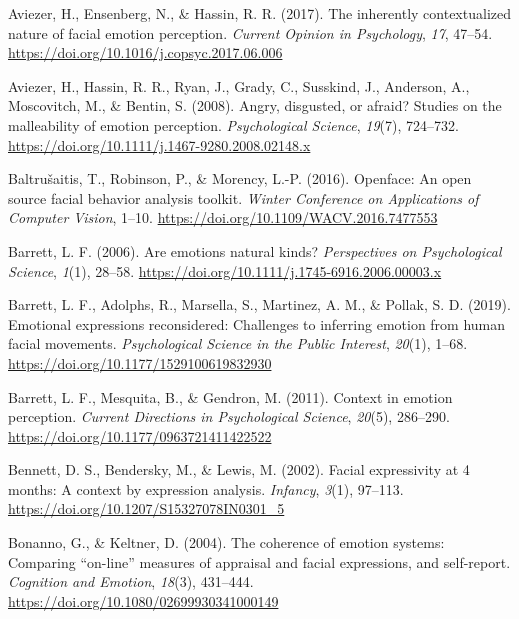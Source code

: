 \documentclass[
  english,
  doc]{apa7}
\newlength{\cslhangindent}
\newenvironment{cslreferences}%
  {\setlength{\parindent}{0pt}%
  \everypar{\setlength{\hangindent}{\cslhangindent}}\ignorespaces}%
  {\par}
\begin{document}
\begingroup
\setlength{\parindent}{-0.5in}
\setlength{\leftskip}{0.5in}

\hypertarget{refs}{}
\begin{cslreferences}
\leavevmode\hypertarget{ref-aviezer2017inherently}{}%
Aviezer, H., Ensenberg, N., \& Hassin, R. R. (2017). The inherently contextualized nature of facial emotion perception. \emph{Current Opinion in Psychology}, \emph{17}, 47--54. \url{https://doi.org/10.1016/j.copsyc.2017.06.006}

\leavevmode\hypertarget{ref-aviezer2008angry}{}%
Aviezer, H., Hassin, R. R., Ryan, J., Grady, C., Susskind, J., Anderson, A., Moscovitch, M., \& Bentin, S. (2008). Angry, disgusted, or afraid? Studies on the malleability of emotion perception. \emph{Psychological Science}, \emph{19}(7), 724--732. \url{https://doi.org/10.1111/j.1467-9280.2008.02148.x}

\leavevmode\hypertarget{ref-baltruvsaitis2016openface}{}%
Baltrušaitis, T., Robinson, P., \& Morency, L.-P. (2016). Openface: An open source facial behavior analysis toolkit. \emph{Winter Conference on Applications of Computer Vision}, 1--10. \url{https://doi.org/10.1109/WACV.2016.7477553}

\leavevmode\hypertarget{ref-barrett2006emotions}{}%
Barrett, L. F. (2006). Are emotions natural kinds? \emph{Perspectives on Psychological Science}, \emph{1}(1), 28--58. \url{https://doi.org/10.1111/j.1745-6916.2006.00003.x}

\leavevmode\hypertarget{ref-barrett2019emotional}{}%
Barrett, L. F., Adolphs, R., Marsella, S., Martinez, A. M., \& Pollak, S. D. (2019). Emotional expressions reconsidered: Challenges to inferring emotion from human facial movements. \emph{Psychological Science in the Public Interest}, \emph{20}(1), 1--68. \url{https://doi.org/10.1177/1529100619832930}

\leavevmode\hypertarget{ref-barrett2011context}{}%
Barrett, L. F., Mesquita, B., \& Gendron, M. (2011). Context in emotion perception. \emph{Current Directions in Psychological Science}, \emph{20}(5), 286--290. \url{https://doi.org/10.1177/0963721411422522}

\leavevmode\hypertarget{ref-bennett2002facial}{}%
Bennett, D. S., Bendersky, M., \& Lewis, M. (2002). Facial expressivity at 4 months: A context by expression analysis. \emph{Infancy}, \emph{3}(1), 97--113. \url{https://doi.org/10.1207/S15327078IN0301_5}

\leavevmode\hypertarget{ref-bonanno2004brief}{}%
Bonanno, G., \& Keltner, D. (2004). The coherence of emotion systems: Comparing ``on-line'' measures of appraisal and facial expressions, and self-report. \emph{Cognition and Emotion}, \emph{18}(3), 431--444. \url{https://doi.org/10.1080/02699930341000149}


\end{cslreferences}
\end{document}
